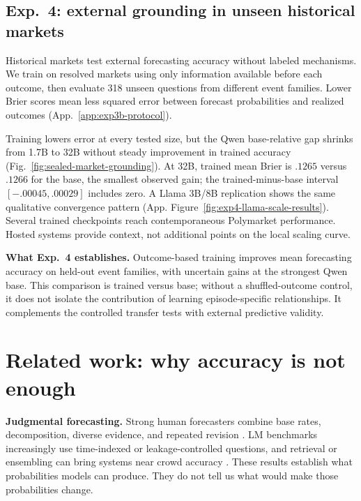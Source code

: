 \documentclass{article}
\begin{document}
\subsection{Exp.~4: external grounding in unseen historical markets}
\label{sec:exp4}

Historical markets test external forecasting accuracy without labeled mechanisms. We train on resolved markets using only
information available before each outcome, then evaluate 318 unseen questions
from different event families. Lower Brier scores mean less squared error
between forecast probabilities and realized outcomes
(App.~\ref{app:exp3b-protocol}).

Training lowers
error at every tested size, but the Qwen base-relative gap shrinks from 1.7B to
32B without steady improvement in trained accuracy (Fig.~\ref{fig:sealed-market-grounding}). At 32B, trained mean Brier is \(.1265\)
versus \(.1266\) for the base, the smallest observed gain; the trained-minus-base
interval \([-.00045,.00029]\) includes zero. A Llama 3B/8B
replication shows the same qualitative convergence pattern
(App. Figure~\ref{fig:exp4-llama-scale-results}). Several trained checkpoints
reach contemporaneous Polymarket performance. Hosted systems provide context,
not additional points on the local scaling curve.

\noindent\textbf{What Exp.~4 establishes.}
Outcome-based training improves mean forecasting accuracy on held-out event
families, with uncertain gains at the strongest Qwen base. This comparison is
trained versus base; without a shuffled-outcome control, it does not isolate the
contribution of learning episode-specific relationships. It complements the controlled transfer tests with external predictive validity.
\section{Related work: why accuracy is not enough}
\label{sec:related-work}

\noindent\textbf{Judgmental forecasting.}
Strong human forecasters combine base rates, decomposition, diverse evidence,
and repeated revision
\citep{tetlock2005expert,mellers2014psychological,tetlock2016superforecasting}.
LM benchmarks increasingly use time-indexed or leakage-controlled questions, and
retrieval or ensembling can bring systems near crowd accuracy
\citep{zou2022forecasting,karger2025forecastbench,halawi2024approaching,schoenegger2024wisdom}.
These results establish what probabilities models can produce. They do not tell
us what would make those probabilities change.
\end{document}
